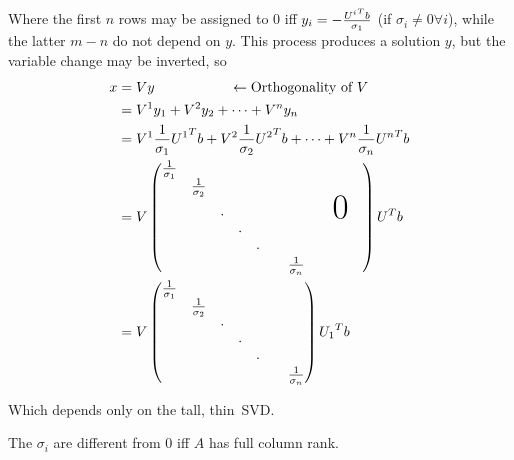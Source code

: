 \documentclass[computational_mathematics.tex]{subfiles}
\begin{document}
Where the first $n$ rows may be assigned to $0$ iff $y_{i} = -\frac{{U^{i}}^{T} b}{\sigma_{1}}$ (if $\sigma_i \neq 0 \forall i$), while the latter $m-n$ do not depend on $y$. This process produces a solution $y$, but the variable change may be inverted, so 
\begin{equation}
  \begin{aligned}
    x &= Vy ~~~~~~~~~~~~~~~~ \leftarrow \text{Orthogonality of} ~V\\
    &= V^1 y_1 + V^2 y_2+ \cdots + V^n y_n\\
    &= V^1 \frac{1}{\sigma_1} \tr{U^1} b + V^2 \frac{1}{\sigma_2} \tr{U^2} b + \cdots + V^n \frac{1}{\sigma_n} \tr{U^n} b\\ 
    &= {V \begin{pmatrix}
      \frac{1}{\sigma_{1}} & & & & &&&&\\
        & \frac{1}{\sigma_{2}} & & & &&&&\\
        & & \cdot & & & &&&\text{\Huge 0}\\
        & & & \cdot & &&&&\\
        & & & & \cdot &&&&&\\
        & & & & & & \frac{1}{\sigma_{n}}&&&\\
    \end{pmatrix} \tr{U} b}\\
    &= {V \begin{pmatrix}
      \frac{1}{\sigma_{1}} & & & &\\
        & \frac{1}{\sigma_{2}} & & &\\
        & & \cdot & & &\\
        & & & \cdot & &\\
        & & & & \cdot &\\
        & & & & & & \frac{1}{\sigma_{n}}\\
    \end{pmatrix} \tr{U_1} b}\\
  \end{aligned}
\end{equation}

Which depends only on the tall, thin~SVD.%
\begin{proposition}
  The $\sigma_{i}$ are different from $0$ iff $A$ has full column rank.
\end{proposition}
\end{document}
